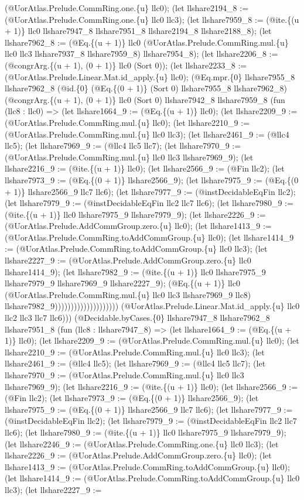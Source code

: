 \documentclass[11pt]{article}
\begin{document}
(@UorAtlas.Prelude.CommRing.one.\{u\} llc0); (let llshare2194\_8 := (@UorAtlas.Prelude.CommRing.one.\{u\} llc0 llc3); (let llshare7959\_8 := (@ite.\{(u + 1)\} llc0 llshare7947\_8 llshare7951\_8 llshare2194\_8 llshare2188\_8); (let llshare7962\_8 := (@Eq.\{(u + 1)\} llc0 (@UorAtlas.Prelude.CommRing.mul.\{u\} llc0 llc3 llshare7937\_8 llshare7959\_8) llshare7954\_8); (let llshare2206\_8 := (@congrArg.\{(u + 1), (0 + 1)\} llc0 (Sort 0)); (let llshare2233\_8 := (@UorAtlas.Prelude.Linear.Mat.id\_apply.\{u\} llc0); (@Eq.mpr.\{0\} llshare7955\_8 llshare7962\_8 (@id.\{0\} (@Eq.\{(0 + 1)\} (Sort 0) llshare7955\_8 llshare7962\_8) (@congrArg.\{(u + 1), (0 + 1)\} llc0 (Sort 0) llshare7942\_8 llshare7959\_8 (fun (llc8 : llc0) => (let llshare1664\_9 := (@Eq.\{(u + 1)\} llc0); (let llshare2209\_9 := (@UorAtlas.Prelude.CommRing.mul.\{u\} llc0); (let llshare2210\_9 := (@UorAtlas.Prelude.CommRing.mul.\{u\} llc0 llc3); (let llshare2461\_9 := (@llc4 llc5); (let llshare7969\_9 := (@llc4 llc5 llc7); (let llshare7970\_9 := (@UorAtlas.Prelude.CommRing.mul.\{u\} llc0 llc3 llshare7969\_9); (let llshare2216\_9 := (@ite.\{(u + 1)\} llc0); (let llshare2566\_9 := (@Fin llc2); (let llshare7973\_9 := (@Eq.\{(0 + 1)\} llshare2566\_9); (let llshare7975\_9 := (@Eq.\{(0 + 1)\} llshare2566\_9 llc7 llc6); (let llshare7977\_9 := (@instDecidableEqFin llc2); (let llshare7979\_9 := (@instDecidableEqFin llc2 llc7 llc6); (let llshare7980\_9 := (@ite.\{(u + 1)\} llc0 llshare7975\_9 llshare7979\_9); (let llshare2226\_9 := (@UorAtlas.Prelude.AddCommGroup.zero.\{u\} llc0); (let llshare1413\_9 := (@UorAtlas.Prelude.CommRing.toAddCommGroup.\{u\} llc0); (let llshare1414\_9 := (@UorAtlas.Prelude.CommRing.toAddCommGroup.\{u\} llc0 llc3); (let llshare2227\_9 := (@UorAtlas.Prelude.AddCommGroup.zero.\{u\} llc0 llshare1414\_9); (let llshare7982\_9 := (@ite.\{(u + 1)\} llc0 llshare7975\_9 llshare7979\_9 llshare7969\_9 llshare2227\_9); (@Eq.\{(u + 1)\} llc0 (@UorAtlas.Prelude.CommRing.mul.\{u\} llc0 llc3 llshare7969\_9 llc8) llshare7982\_9)))))))))))))))))))) (@UorAtlas.Prelude.Linear.Mat.id\_apply.\{u\} llc0 llc2 llc3 llc7 llc6))) (@Decidable.byCases.\{0\} llshare7947\_8 llshare7962\_8 llshare7951\_8 (fun (llc8 : llshare7947\_8) => (let llshare1664\_9 := (@Eq.\{(u + 1)\} llc0); (let llshare2209\_9 := (@UorAtlas.Prelude.CommRing.mul.\{u\} llc0); (let llshare2210\_9 := (@UorAtlas.Prelude.CommRing.mul.\{u\} llc0 llc3); (let llshare2461\_9 := (@llc4 llc5); (let llshare7969\_9 := (@llc4 llc5 llc7); (let llshare7970\_9 := (@UorAtlas.Prelude.CommRing.mul.\{u\} llc0 llc3 llshare7969\_9); (let llshare2216\_9 := (@ite.\{(u + 1)\} llc0); (let llshare2566\_9 := (@Fin llc2); (let llshare7973\_9 := (@Eq.\{(0 + 1)\} llshare2566\_9); (let llshare7975\_9 := (@Eq.\{(0 + 1)\} llshare2566\_9 llc7 llc6); (let llshare7977\_9 := (@instDecidableEqFin llc2); (let llshare7979\_9 := (@instDecidableEqFin llc2 llc7 llc6); (let llshare7980\_9 := (@ite.\{(u + 1)\} llc0 llshare7975\_9 llshare7979\_9); (let llshare2246\_9 := (@UorAtlas.Prelude.CommRing.one.\{u\} llc0 llc3); (let llshare2226\_9 := (@UorAtlas.Prelude.AddCommGroup.zero.\{u\} llc0); (let llshare1413\_9 := (@UorAtlas.Prelude.CommRing.toAddCommGroup.\{u\} llc0); (let llshare1414\_9 := (@UorAtlas.Prelude.CommRing.toAddCommGroup.\{u\} llc0 llc3); (let llshare2227\_9 := 
\end{document}
